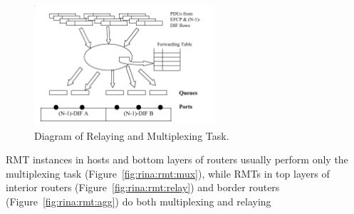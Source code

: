             \begin{figure}[H]
                \begin{center}
                    \includegraphics[width=0.6\textwidth]{fig/fwding_rmt-module.png}
                  \caption{Diagram of Relaying and Multiplexing Task.}
                  \label{fig:rina:rmt:model}
                \end{center}
            \end{figure}

            RMT instances in hosts and bottom layers of routers usually perform only the multiplexing task (Figure~\ref{fig:rina:rmt:mux}), while RMTs in top layers of interior routers (Figure~\ref{fig:rina:rmt:relay}) and border routers (Figure~\ref{fig:rina:rmt:agg}) do both multiplexing and relaying

